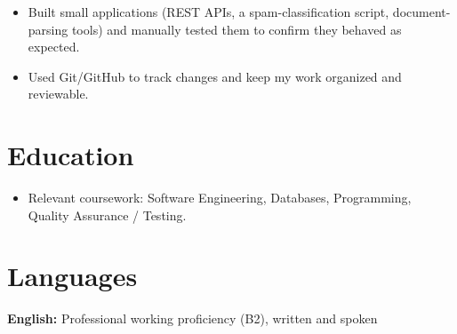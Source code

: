 \documentclass[11pt]{article}
\begin{document}
\begin{itemize}
  \item Built small applications (REST APIs, a spam-classification script, document-parsing tools) and manually tested them to confirm they behaved as expected.
  \item Used Git/GitHub to track changes and keep my work organized and reviewable.
\end{itemize}

\section{Education}
\begin{itemize}
  \item Relevant coursework: Software Engineering, Databases, Programming, Quality Assurance / Testing.
\end{itemize}

\section{Languages}
 \quad\textbullet\quad \textbf{English:} Professional working proficiency (B2), written and spoken
\end{document}

